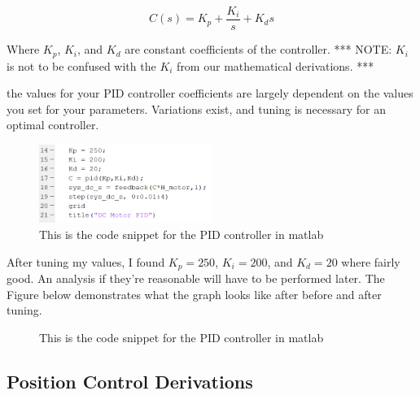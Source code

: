 \begin{equation}
C(s) = K_{p} + \frac{K_{i}}{s}+K_{d} s
\end{equation}

\noindent Where $K_{p}$, $K_{i}$, and $K_{d}$ are constant coefficients of the controller. *** NOTE: $K_{i}$ is not to be confused with the $K_{i}$ from our mathematical derivations. ***

\noindent the values for your PID controller coefficients are largely dependent on the values you set for your parameters. Variations exist, and tuning is necessary for an optimal controller. 

\begin{figure}[H]
\centering
\includegraphics[width = 0.5\textwidth]{./Angel_img/DC_SPEED_PIDCode.png}
\caption{\label{fig:code_speed_PIDCode} This is the code snippet for the PID controller in matlab}
\end{figure}

After tuning my values, I found $K_{p} = 250$, $K_{i} = 200$, and $K_{d} = 20$ where fairly good. An analysis if they're reasonable will have to be performed later. The Figure below demonstrates what the graph looks like after before and after tuning.

\begin{figure}[H]
\centering
{}
\caption{\label{fig:code_speed_PIDtune} This is the code snippet for the PID controller in matlab}
\end{figure}
\subsection{Position Control Derivations}

